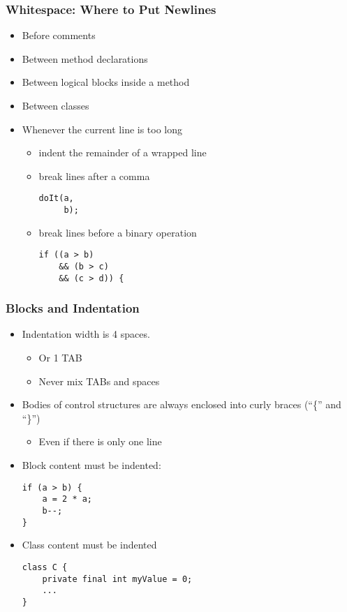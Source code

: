 \documentclass[screen]{beamer}
\begin{document}
\begin{frame}[fragile]
\frametitle{Whitespace: Where to Put Newlines}%
%
\begin{itemize}[<+->]
	\item Before comments
	\item Between method declarations
	\item Between logical blocks inside a method
	\item Between classes
	\item Whenever the current line is too long 
		\begin{itemize}
			\item indent the remainder of a wrapped line 
			\item break lines after a comma
\begin{lstlisting}
doIt(a,
     b);
\end{lstlisting}
			\item break lines before a binary operation
\begin{lstlisting}
if ((a > b)
    && (b > c)
    && (c > d)) {
\end{lstlisting}
		\end{itemize}
\end{itemize}
\end{frame}

\begin{frame}[fragile]
\frametitle{Blocks and Indentation}%
%
\begin{itemize}[<+->]
	\item Indentation width is 4 spaces.
		\begin{itemize}
			\item Or 1 TAB
			\item \alert{Never mix TABs and spaces}
		\end{itemize}
	\item Bodies of control structures are always enclosed into curly braces (``\{'' and ``\}'')
		\begin{itemize}
			\item \alert{Even if there is only one line}
		\end{itemize}
	\item Block content must be indented:
\begin{lstlisting}
if (a > b) {
	a = 2 * a;
	b--;
}
\end{lstlisting}
	\item Class content must be indented
\begin{lstlisting}
class C {
	private final int myValue = 0;
	...
}
\end{lstlisting}
\end{itemize}
\end{frame}
\end{document}
